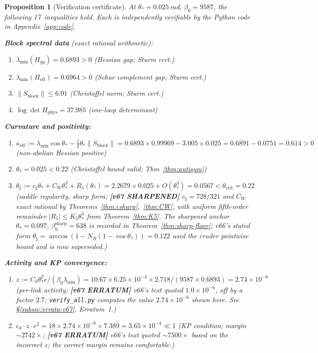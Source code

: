 \documentclass[11pt]{article}
\newtheorem{proposition}[theorem]{Proposition}
\theoremstyle{definition}
\begin{document}
\begin{proposition}[Verification certificate]\label{prop:certificate}
At $\theta_*=0.025$\,rad, $\beta_0=9587$, the following
17~inequalities hold.  Each is independently verifiable by the
Python code in Appendix~\ref{app:code}.

\medskip\noindent
\textbf{Block spectral data} (exact rational arithmetic):
\begin{enumerate}[nosep,label=(V\arabic*)]
\item $\lambda_{\min}(H_{yy})=0.6893>0$
\quad\emph{(Hessian gap; Sturm cert.)}
\item $\lambda_{\min}(H_{\mathrm{eff}})=0.6964>0$
\quad\emph{(Schur complement gap; Sturm cert.)}
\item $\|S_{\mathrm{block}}\|\le 6.01$
\quad\emph{(Christoffel norm; Sturm cert.)}
\item $\log\det H_{\mathrm{phys}}=37.985$
\quad\emph{(one-loop determinant)}
\end{enumerate}

\noindent\textbf{Curvature and positivity:}
\begin{enumerate}[nosep,label=(V\arabic*),resume]
\item $\kappa_{\mathrm{eff}}
:=\lambda_{\min}\cos\theta_*
-\tfrac{1}{2}\theta_*\|S_{\mathrm{block}}\|
=0.6893\times 0.99969-3.005\times 0.025
=0.6891-0.0751=0.614>0$
\quad\emph{(non-abelian Hessian positive)}
\item $\theta_*=0.025<0.22$
\quad\emph{(Christoffel bound valid; Thm~\ref{thm:antisym})}
\item $\theta_\sharp:=c_\sharp\theta_*+C_W\theta_*^3+R_5(\theta_*)
=2.2679\times 0.025+O(\theta_*^3)=0.0567<\theta_{\mathrm{crit}}=0.22$
\quad\emph{(saddle regularity, sharp form; \textbf{[v67 SHARPENED]}
$c_\sharp=728/321$ and $C_W$ exact rational by
Theorems~\ref{thm:csharp},~\ref{thm:CW}, with uniform fifth-order
remainder $|R_5|\le K_5\theta_*^5$ from Theorem~\ref{thm:K5}.
The sharpened anchor $\theta_*=0.097$, $\beta_0^{\mathrm{sharp}}=638$
is recorded in Theorem~\ref{thm:sharp-floor}; v66's stated form
$\theta_\sharp=\arccos(1-N_B(1-\cos\theta_*))=0.122$ used the cruder
pointwise bound and is now superseded.)}
\end{enumerate}

\noindent\textbf{Activity and KP convergence:}
\begin{enumerate}[nosep,label=(V\arabic*),resume]
\item $z:=C_0\theta_*^2 e/(\beta_0\lambda_{\min})
=10.67\times 6.25\times 10^{-4}\times 2.718/(9587\times 0.6893)
=2.74\times 10^{-6}$
\quad\emph{(per-link activity; \textbf{[v67 ERRATUM]} v66's text
quoted $1.0\times 10^{-6}$, off by a factor $2.7$;
\texttt{verify\_all.py} computes the value $2.74\times 10^{-6}$
shown here.  See \S\ref{subsec:errata-v67}, Erratum~1.)}
\item $c_d\cdot z\cdot e^2
=18\times 2.74\times 10^{-6}\times 7.389
=3.65\times 10^{-4}\ll 1$
\quad\emph{(KP condition; margin $\sim 2742\times$;
\textbf{[v67 ERRATUM]} v66's text quoted $\sim 7500\times$
based on the incorrect $z$; the correct margin remains comfortable.)}
\end{enumerate}


\end{proposition}
\end{document}
